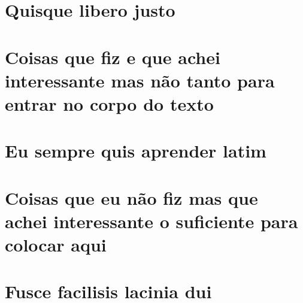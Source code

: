 \documentclass[12pt, %
openright, 
oneside, %
a4paper,    %
brazil]{facom-ufu-abntex2}
\begin{document}




\begin{apendicesenv}

\partapendices

\chapter{Quisque libero justo}

\lipsum[50]

\chapter{Coisas que fiz e que achei interessante mas não tanto para entrar no corpo do texto}
\lipsum[55-57]

\end{apendicesenv}



\begin{anexosenv}

\partanexos

\chapter{Eu sempre quis aprender latim}
\lipsum[30]

\chapter{Coisas que eu não fiz mas que achei interessante o suficiente para colocar aqui}

\lipsum[31]

\chapter{Fusce facilisis lacinia dui}

\lipsum[32]

\end{anexosenv}


\printindex
\end{document}
